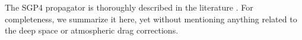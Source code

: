 \documentclass{article}
\begin{document}
The SGP4 propagator is thoroughly described in the literature \cite{HootsRoehrich1980,ValladoCrawfordHujsakKelso2006}. For completeness, we summarize it here, yet without mentioning anything related to the deep space or atmospheric drag corrections.

%

\end{document}
